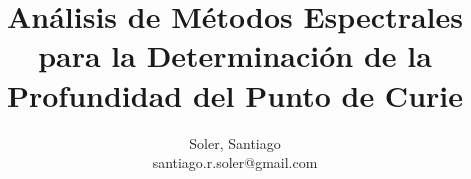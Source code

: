 \documentclass[a4paper,11pt,twocolumn,twoside]{article}
\begin{document}
\title{\bf Análisis de Métodos Espectrales para la Determinación de la Profundidad del Punto de Curie}
\author{Soler, Santiago \\{\small santiago.r.soler@gmail.com }}

    
\end{document}
